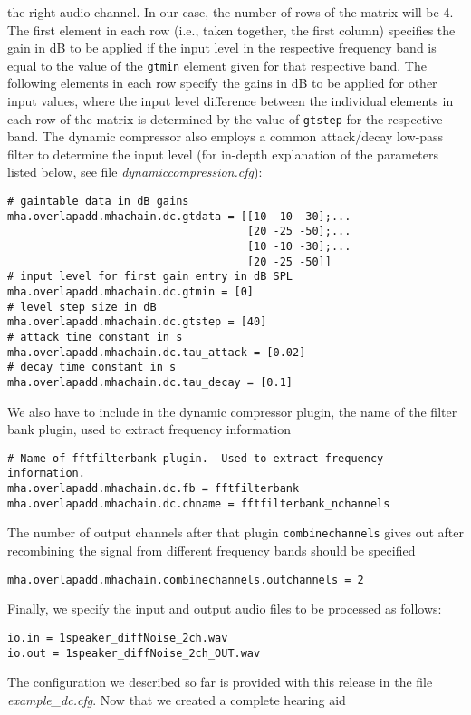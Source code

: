 the right audio channel. In our case, the number of rows of the 
matrix will be 4.
%
The first element in each row (i.e., taken together, the first
column) specifies the gain in dB to be applied if the input level in
the respective frequency band is equal to the value of the \verb!gtmin!
element given for that respective band.
%
The following elements in each row specify the gains in dB to be
applied for other input values, where the input level difference
between the individual elements in each row of the matrix is
determined by the value of \verb!gtstep! for the respective 
band. The dynamic compressor also employs a common attack/decay low-pass filter
to determine the input level (for in-depth explanation of the parameters 
listed below, see file \emph{dynamiccompression.cfg}):
\begin{verbatim}
# gaintable data in dB gains
mha.overlapadd.mhachain.dc.gtdata = [[10 -10 -30];...
                                     [20 -25 -50];...
                                     [10 -10 -30];...
                                     [20 -25 -50]]
# input level for first gain entry in dB SPL
mha.overlapadd.mhachain.dc.gtmin = [0]
# level step size in dB
mha.overlapadd.mhachain.dc.gtstep = [40]
# attack time constant in s
mha.overlapadd.mhachain.dc.tau_attack = [0.02]
# decay time constant in s
mha.overlapadd.mhachain.dc.tau_decay = [0.1]
\end{verbatim}
%
We also have to include in the dynamic compressor plugin, the name 
of the filter bank plugin, used to extract frequency information
\begin{verbatim}
# Name of fftfilterbank plugin.  Used to extract frequency information.
mha.overlapadd.mhachain.dc.fb = fftfilterbank
mha.overlapadd.mhachain.dc.chname = fftfilterbank_nchannels
\end{verbatim}
%
The number of output channels after that plugin \verb!combinechannels! 
gives out after recombining the signal from different frequency 
bands should be specified
\begin{verbatim}
mha.overlapadd.mhachain.combinechannels.outchannels = 2
\end{verbatim}
%
Finally, we specify the input and output audio files to be processed as 
follows:
\begin{verbatim}
io.in = 1speaker_diffNoise_2ch.wav
io.out = 1speaker_diffNoise_2ch_OUT.wav
\end{verbatim}
The configuration we described so far is provided with this release 
in the file \emph{example\_dc.cfg}.
Now that we created a complete \mha{} hearing aid
